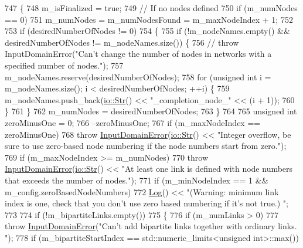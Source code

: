 \begin{DoxyCode}
747 \{
748     m\_isFinalized = \textcolor{keyword}{true};
749     \textcolor{comment}{// If no nodes defined}
750     \textcolor{keywordflow}{if} (m\_numNodes == 0)
751         m\_numNodes = m\_numNodesFound = m\_maxNodeIndex + 1;
752 
753     \textcolor{keywordflow}{if} (desiredNumberOfNodes != 0)
754     \{
755         \textcolor{keywordflow}{if} (!m\_nodeNames.empty() && desiredNumberOfNodes != m\_nodeNames.size()) \{
756             \textcolor{comment}{// throw InputDomainError("Can't change the number of nodes in networks with a specified number
       of nodes.");}
757             m\_nodeNames.reserve(desiredNumberOfNodes);
758             \textcolor{keywordflow}{for} (\textcolor{keywordtype}{unsigned} \textcolor{keywordtype}{int} i = m\_nodeNames.size(); i < desiredNumberOfNodes; ++i) \{
759                 m\_nodeNames.push\_back(\mbox{\hyperlink{classio_1_1Str}{io::Str}}() << \textcolor{stringliteral}{"\_completion\_node\_"} << (i + 1));
760             \}
761         \}
762         m\_numNodes = desiredNumberOfNodes;
763     \}
764 
765     \textcolor{keywordtype}{unsigned} \textcolor{keywordtype}{int} zeroMinusOne = 0;
766     --zeroMinusOne;
767     \textcolor{keywordflow}{if} (m\_maxNodeIndex == zeroMinusOne)
768         \textcolor{keywordflow}{throw} \mbox{\hyperlink{classInputDomainError}{InputDomainError}}(\mbox{\hyperlink{classio_1_1Str}{io::Str}}() << \textcolor{stringliteral}{"Integer overflow, be sure to use
       zero-based node numbering if the node numbers start from zero."});
769     \textcolor{keywordflow}{if} (m\_maxNodeIndex >= m\_numNodes)
770         \textcolor{keywordflow}{throw} \mbox{\hyperlink{classInputDomainError}{InputDomainError}}(\mbox{\hyperlink{classio_1_1Str}{io::Str}}() << \textcolor{stringliteral}{"At least one link is defined with node
       numbers that exceeds the number of nodes."});
771     \textcolor{keywordflow}{if} (m\_minNodeIndex == 1 && m\_config.zeroBasedNodeNumbers)
772         \mbox{\hyperlink{classLog}{Log}}() << \textcolor{stringliteral}{"(Warning: minimum link index is one, check that you don't use zero based numbering if
       it's not true.) "};
773 
774     \textcolor{keywordflow}{if} (!m\_bipartiteLinks.empty())
775     \{
776         \textcolor{keywordflow}{if} (m\_numLinks > 0)
777             \textcolor{keywordflow}{throw} \mbox{\hyperlink{classInputDomainError}{InputDomainError}}(\textcolor{stringliteral}{"Can't add bipartite links together with ordinary links.
      "});
778         \textcolor{keywordflow}{if} (m\_bipartiteStartIndex == std::numeric\_limits<unsigned int>::max())

\end{DoxyCode}
